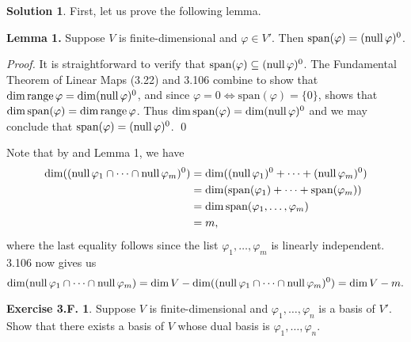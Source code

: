 \documentclass[12pt]{article}
\theoremstyle{definition}
\theoremstyle{exercise}
\newtheorem{exercise}{Exercise 3.F.}
\theoremstyle{solution}
\newtheorem*{solution}{Solution}
\newcommand{\Span}{\text{span}}
\newcommand{\Null}{\text{null\,}}
\newcommand{\Range}{\text{range\,}}
\begin{document}
\begin{solution}
    First, let us prove the following lemma.

    \vspace{2mm}

    \noindent \textbf{Lemma 1.} Suppose \( V \) is finite-dimensional and \( \varphi \in V' \). Then \( \Span(\varphi) = (\Null \varphi)^0 \).

    \vspace{2mm}

    \noindent \textit{Proof.} It is straightforward to verify that \( \Span(\varphi) \subseteq (\Null \varphi)^0 \). The Fundamental Theorem of Linear Maps (3.22) and 3.106 combine to show that \( \dim \Range \varphi = \dim (\Null \varphi)^0 \), and since \( \varphi = 0 \iff \Span(\varphi) = \{ 0 \} \),  shows that \( \dim \Span(\varphi) = \dim \Range \varphi \). Thus \( \dim \Span(\varphi) = \dim (\Null \varphi)^0 \) and we may conclude that \( \Span(\varphi) = (\Null \varphi)^0 \). \qed

    \vspace{2mm}

    Note that by  and Lemma 1, we have
    \begin{align*}
        \dim((\Null \varphi_1 \cap \cdots \cap \Null \varphi_m)^0) &= \dim((\Null \varphi_1)^0 + \cdots + (\Null \varphi_m)^0) \\
        &= \dim (\Span(\varphi_1) + \cdots + \Span(\varphi_m)) \\
        &= \dim \Span(\varphi_1, \ldots, \varphi_m) \\
        &= m,
    \end{align*}
    where the last equality follows since the list \( \varphi_1, \ldots, \varphi_m \) is linearly independent. 3.106 now gives us
    \[
        \dim(\Null \varphi_1 \cap \cdots \cap \Null \varphi_m) = \dim V - \dim((\Null \varphi_1 \cap \cdots \cap \Null \varphi_m)^0) = \dim V - m.
    \]
\end{solution}

\begin{exercise}
\label{ex:31}
    Suppose \( V \) is finite-dimensional and \( \varphi_1, \ldots, \varphi_n \) is a basis of \( V' \). Show that there exists a basis of \( V \) whose dual basis is \( \varphi_1, \ldots, \varphi_n \).
\end{exercise}
\end{document}
